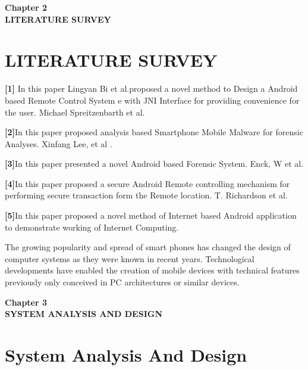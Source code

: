 \documentclass[12pt]{article}
\begin{document}
\begin{center}
 \LARGE \textbf {Chapter 2 }\\[10mm]
 \Large \textbf{LITERATURE SURVEY}\\[10mm]
 \end{center}
 \section{LITERATURE SURVEY}\par
\textbf{[1]} In this paper Lingyan Bi et al.proposed a novel method to Design a Android
based Remote Control System e with JNI Interface for providing convenience for
the user. Michael Spreitzenbarth et al.\par
\textbf{[2]}In this paper proposed analysis based Smartphone Mobile Malware for forensic
Analyses. Xinfang Lee, et al .\par
\textbf{[3]}In this paper presented a novel Android based Forensic System. Enck, W et al.\par
\textbf{[4]}In this paper proposed a secure Android Remote controlling mechanism for
performing secure transaction form the Remote location. T. Richardson et al.\par
\textbf{[5]}In this paper proposed a novel method of Internet based Android application
to demonstrate working of Internet Computing.\\[2mm]\par

The growing popularity and spread of smart phones has changed the design of
computer systems as they were known in recent years. Technological
developments have enabled the creation of mobile devices with technical features
previously only conceived in PC architectures or similar devices.


\clearpage





\begin{center}
 \LARGE \textbf {Chapter 3 }\\[10mm]
 \Large \textbf{SYSTEM ANALYSIS AND DESIGN}\\[10mm]
 \end{center}
 \section{System Analysis And Design}
\end{document}
